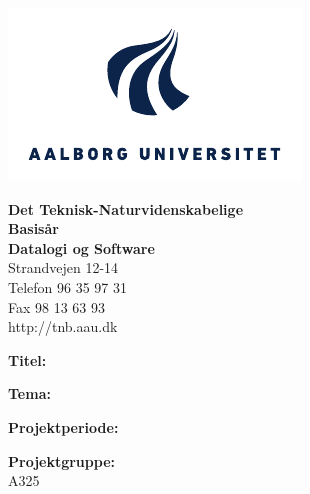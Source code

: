\begin{titlepage}
  \begin{minipage}{0.40\textwidth}
  \includegraphics[width=\textwidth]{Billeder/aau-logo-new.pdf}
  \end{minipage}
  \hfill
  \begin{minipage}{0.40\textwidth}
    {\sf\small \textbf{Det Teknisk-Naturvidenskabelige\\ Basis{\aa}r }}\\
    {\sf\small  \textbf{Datalogi og Software}} \\
    {\sf\small Strandvejen 12-14} \\
    {\sf\small Telefon 96 35 97 31} \\
    {\sf\small Fax 98 13 63 93} \\
    {\sf\small http://tnb.aau.dk}
  \end{minipage}
  
  \begin{minipage}{0.4\textwidth}
    \begin{description}
    \vspace{1cm}
    
    \item {\bf Titel:}\\ \rtitle
    
    \item {\bf Tema:}\\ \rtheme 
    
    \item {\bf Projektperiode:}\\ \rperiod
    
    \item {\bf Projektgruppe:}\\ A325
    

\end{description}
\end{minipage}
\end{titlepage}
